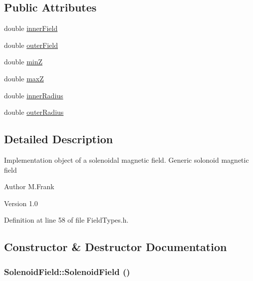 \subsection*{Public Attributes}
\begin{DoxyCompactItemize}
\item 
double \hyperlink{class_d_d4hep_1_1_geometry_1_1_solenoid_field_a4f18728f3a52760c259432d4c2c6d2af}{innerField}
\item 
double \hyperlink{class_d_d4hep_1_1_geometry_1_1_solenoid_field_a7a98e6f75ae53445e6b1dad2a4279ac9}{outerField}
\item 
double \hyperlink{class_d_d4hep_1_1_geometry_1_1_solenoid_field_a51af6d29a975015b6f539d514ddc1000}{minZ}
\item 
double \hyperlink{class_d_d4hep_1_1_geometry_1_1_solenoid_field_aa38b5bc9144edd3b19a837c8c2473e96}{maxZ}
\item 
double \hyperlink{class_d_d4hep_1_1_geometry_1_1_solenoid_field_a76e7d98a12bae50393178361083ef37e}{innerRadius}
\item 
double \hyperlink{class_d_d4hep_1_1_geometry_1_1_solenoid_field_a4243bc378c9ad5c7021e9f8525691da9}{outerRadius}
\end{DoxyCompactItemize}


\subsection{Detailed Description}
Implementation object of a solenoidal magnetic field. Generic solonoid magnetic field

\begin{DoxyAuthor}{Author}
M.Frank 
\end{DoxyAuthor}
\begin{DoxyVersion}{Version}
1.0 
\end{DoxyVersion}


Definition at line 58 of file FieldTypes.h.

\subsection{Constructor \& Destructor Documentation}
\hypertarget{class_d_d4hep_1_1_geometry_1_1_solenoid_field_a882732fe549f63858d40cca4c5133bf9}{
\subsubsection[{SolenoidField}]{\setlength{\rightskip}{0pt plus 5cm}SolenoidField::SolenoidField ()}}
\label{class_d_d4hep_1_1_geometry_1_1_solenoid_field_a882732fe549f63858d40cca4c5133bf9}


